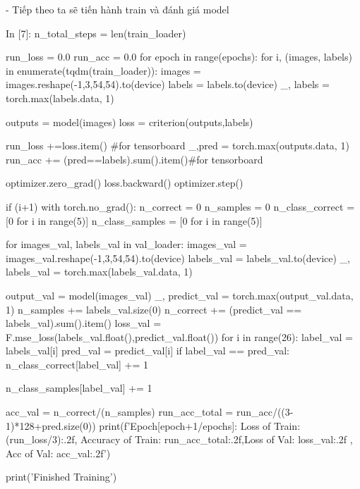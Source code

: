 \documentclass[12pt, a4paper]{article}
\begin{document}
\par - Tiếp theo ta sẽ tiến hành train và đánh giá model

\newpage
\begin{python}
In [7]:
n_total_steps = len(train_loader)

run_loss = 0.0
run_acc = 0.0
for epoch in range(epochs):
    for i, (images, labels) in enumerate(tqdm(train_loader)):
        images = images.reshape(-1,3,54,54).to(device)
        labels = labels.to(device)
        _, labels = torch.max(labels.data, 1)

        outputs = model(images)
        loss = criterion(outputs,labels)
        
        run_loss +=loss.item() #for tensorboard
        _,pred = torch.max(outputs.data, 1)
        run_acc += (pred==labels).sum().item()#for tensorboard
        
        optimizer.zero_grad()
        loss.backward()
        optimizer.step()
        
        if (i+1) %
            with torch.no_grad():
                n_correct = 0
                n_samples = 0
                n_class_correct = [0 for i in range(5)]
                n_class_samples = [0 for i in range(5)]
                
                for images_val, labels_val in val_loader:
                    images_val = images_val.reshape(-1,3,54,54).to(device)
                    labels_val = labels_val.to(device)
                    _, labels_val = torch.max(labels_val.data, 1)
                    
                    output_val = model(images_val)
                    _, predict_val = torch.max(output_val.data, 1)
                    n_samples += labels_val.size(0)
                    n_correct += (predict_val == labels_val).sum().item()
                    loss_val = F.mse_loss(labels_val.float(),predict_val.float())
                    for i in range(26):
                        label_val = labels_val[i]
                        pred_val = predict_val[i]
                        if label_val == pred_val:
                            n_class_correct[label_val] += 1
                            
                        n_class_samples[label_val] += 1
                        
                acc_val = n_correct/(n_samples)
                run_acc_total = run_acc/((3-1)*128+pred.size(0))
                print(f'Epoch[{epoch+1}/{epochs}]:  Loss of Train: {(run_loss/3):.2f}, Accuracy of Train: {run_acc_total:.2f},Loss of Val: {loss_val:.2f} , Acc of Val: {acc_val:.2f}')
                      
print('Finished Training')
\end{python}
\end{document}
